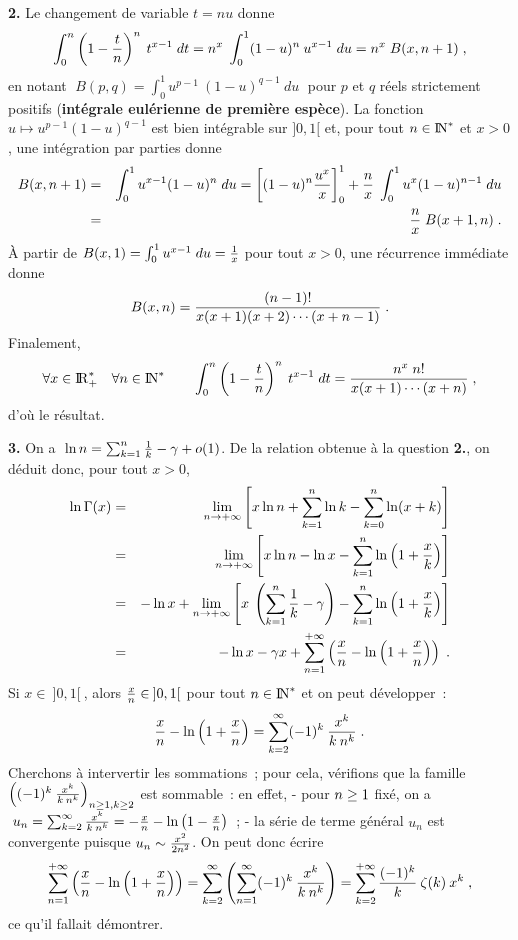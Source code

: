 \documentclass{article}
\begin{document}
\msk
{\bf 2.} Le changement de variable $t=nu$ donne\vv
$$\int_0^n\left(1-{t\over n}\right)^n\>t^{x-1}\;dt =n^x\;\int_0^1(1-u)^n
                                                         \>u^{x-1}\;du
                                                    =n^x\;B(x,n+1)\;,$$
en notant $\;B(p,q)=\int_0^1u^{p-1}\>(1-u)^{q-1}\>du\;$ pour $p$ et $q$ r\'eels strictement positifs ({\bf int\'egrale eul\'erienne de premi\`ere esp\`ece}). La fonction $u\mapsto u^{p-1}(1-u)^{q-1}$
est bien int\'egrable sur $]0,1[$ et, pour tout $n\in{\rm I\kern-0.5mm N}^*$ et $x>0$, une int\'egration
par parties donne\vv
\begin{eqnarray*}
B(x,n+1) & = & \int_0^1u^{x-1}(1-u)^n\;du
                      =\left[(1-u)^n{u^x\over x}\right]_0^1+{n\over x}\;
                                 \int_0^1u^x(1-u)^{n-1}\;du\\
                    & = & {n\over x}\;B(x+1,n)\;.
\end{eqnarray*}
\`A partir de $B(x,1)=\int_0^1u^{x-1}\;du={1\over x}$ pour tout $x>0$, une
r\'ecurrence imm\'ediate donne
$$B(x,n)={(n-1)!\over x(x+1)(x+2)\cdots(x+n-1)}\;.$$
Finalement,\vv
$$\forall x\in{\rm I\kern-0.6mm R}_+^*\quad\forall n\in{\rm I\kern-0.5mm N}^*\qquad\int_0^n\left(1-{t\over n}\right)^n\>t^{x-1}\;dt={n^x\;n!\over x(x+1)\cdots(x+n)}\;,$$
d'o\`u le r\'esultat. 

\msk
{\bf 3.} On a $\;\ln n=\sum_{k=1}^n{1\over k}-\gamma+o(1)$.
De la relation obtenue \`a la question {\bf 2.}, on d\'eduit donc, pour tout $x>0$,\vv\vvvv
\begin{eqnarray*}
\ln\Gamma(x) & = & \lim_{n\rightarrow+\infty}\left[ x\ln n+\sum_{k=1}^n\ln k-
                              \sum_{k=0}^n\ln(x+k)\right]\\
                        & = & \lim_{n\rightarrow+\infty}\left[ x\ln n-\ln x-\sum_{k=1}^n
                              \ln\left(1+{x\over k}\right)\right]\\
                        & = & -\ln x+\lim_{n\rightarrow+\infty}\left[ x\>\left(\sum_{k=1}^n{1\over k}
                              -\gamma\right)-\sum_{k=1}^n\ln\left(1+{x\over k}\right)\right]\\
                        & = & -\ln x-\gamma x+\sum_{n=1}^{+\infty}\left({x\over n}-\ln\left(
                              1+{x\over n}\right)\right)\;.
\end{eqnarray*}
\sect
Si $x\in\>]0,1[\>$, alors ${x\over n}\in\>]0,1[$ pour tout $n\in{\rm I\kern-0.5mm N}^*$ et on peut d\'evelopper~:\vv
$${x\over n}-\ln\left(1+{x\over n}\right)=\sum_{k=2}^{\infty}(-1)^k\>{x^k\over k\>n^k}\;.$$
Cherchons \`a intervertir les sommations~; pour cela, v\'erifions que la famille $\left((-1)^k\>{x^k\over k\>n^k}\right)_{n\geq1,k\geq2}$ est sommable~: en effet,\ssk\new 
- pour $n\geq1$ fix\'e, on a $\;u_n=\sum_{k=2}^{\infty}{x^k\over k\>n^k}=-{x\over n}-\ln\left(1-{x\over n}\right)$~;\ssk\new
- la s\'erie de terme g\'en\'eral $u_n$ est convergente puisque $u_n\sim{x^2\over2n^2}$.\msk\sect
On peut donc \'ecrire\vv
$$\sum_{n=1}^{+\infty}\left({x\over n}-\ln\left(1+{x\over n}\right)\right)=\sum_{k=2}^{\infty}\left(\sum_{n=1}^{\infty}(-1)^k\>{x^k\over k\>n^k}\right)=\sum_{k=2}^{+\infty}{(-1)^k\over k}\>\zeta(k)\>x^k\;,$$
ce qu'il fallait d\'emontrer.
\end{document}
